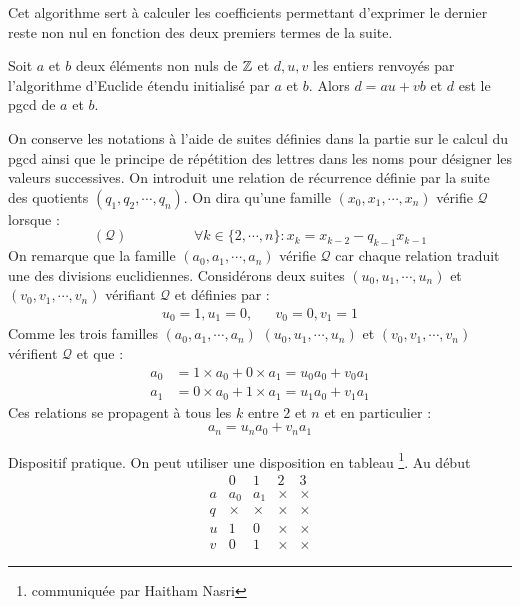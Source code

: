 Cet algorithme sert à calculer les coefficients permettant d'exprimer le dernier reste non nul en fonction des deux premiers termes de la suite.
\begin{propn}\label{coeff}
 Soit $a$ et $b$ deux éléments non nuls de $\mathbb{Z}$ et $d, u, v$ les entiers renvoyés par l'algorithme d'Euclide étendu initialisé par $a$ et $b$. Alors $d = au + vb$ et $d$ est le pgcd de $a$ et $b$. 
\end{propn}
\begin{demo}
On conserve les notations à l'aide de suites définies dans la partie sur le calcul du pgcd ainsi que le principe de répétition des lettres dans les noms pour désigner les valeurs successives.\newline
On introduit une relation de récurrence définie par la suite des quotients $(q_1,q_2,\cdots,q_n)$. On dira qu'une famille $(x_0,x_1,\cdots,x_n)$ vérifie $\mathcal Q$ lorsque :
\begin{displaymath}
 (\mathcal Q)\hspace{2cm} \forall k\in\{2,\cdots,n\} : x_k = x_{k-2}-q_{k-1}x_{k-1}
\end{displaymath}
On remarque que la famille $(a_0,a_1,\cdots,a_n)$ vérifie $\mathcal Q$ car chaque relation traduit une des divisions euclidiennes. Considérons deux suites $(u_0,u_1,\cdots,u_n)$ et $(v_0,v_1,\cdots,v_n)$ vérifiant $\mathcal Q$ et définies par :
\begin{align*}
 u_0=1, u_1=0,  & & v_0=0, v_1=1
\end{align*}
Comme les trois familles $(a_0,a_1,\cdots,a_n)$ $(u_0,u_1,\cdots,u_n)$ et $(v_0,v_1,\cdots,v_n)$ vérifient $\mathcal Q$ et que :
\begin{align*}
 a_0 &= 1\times a_0 + 0\times a_1 = u_0a_0 + v_0a_1 \\
 a_1 &= 0\times a_0 + 1\times a_1 = u_1a_0 + v_1a_1
\end{align*}
Ces relations se propagent à tous les $k$ entre $2$ et $n$ et en particulier :
\begin{displaymath}
 a_n = u_na_0 + v_na_1
\end{displaymath}
\end{demo}
Dispositif pratique. On peut utiliser une disposition en tableau \footnote{communiquée par Haitham Nasri}. Au début
\begin{displaymath}
\begin{array}{l|l|l|l|l}
 & 0 & 1 & 2 & 3 \\ \hline
a & a_0 & a_1 & \times & \times \\ 
q & \times & \times & \times & \times \\ 
u & 1 & 0 & \times & \times \\
v & 0 & 1 & \times & \times
\end{array}
\end{displaymath}
